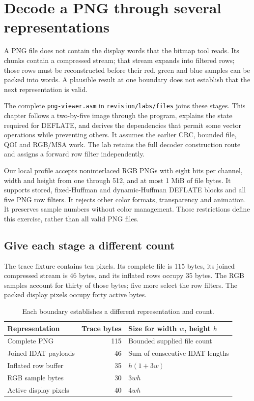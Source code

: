 \chapter{Decode a PNG through several representations}
\label{revision:png}

A PNG file does not contain the display words that the bitmap tool reads. Its
chunks contain a compressed stream; that stream expands into filtered rows;
those rows must be reconstructed before their red, green and blue samples can
be packed into words. A plausible result at one boundary does not establish
that the next representation is valid.

The complete \texttt{png-viewer.asm} in \texttt{revision/labs/files} joins these
stages. This chapter follows a two-by-five image through the program, explains
the state required for DEFLATE, and derives the dependencies that permit some
vector operations while preventing others. It assumes the earlier CRC, bounded
file, QOI and RGB/MSA work. The lab retains the full decoder construction route
and assigns a forward row filter independently.

Our local profile accepts noninterlaced RGB PNGs with eight bits per channel,
width and height from one through 512, and at most 1 MiB of file bytes. It
supports stored, fixed-Huffman and dynamic-Huffman DEFLATE blocks and all five
PNG row filters. It rejects other color formats, transparency and animation.
It preserves sample numbers without color management. Those restrictions define
this exercise, rather than all valid PNG files.

\section{Give each stage a different count}

The trace fixture contains ten pixels. Its complete file is 115 bytes, its
joined compressed stream is 46 bytes, and its inflated rows occupy 35 bytes.
The RGB samples account for thirty of those bytes; five more select the row
filters. The packed display pixels occupy forty active bytes.

\begin{table}[!ht]
  \centering
  \begin{tabular}{l r l}
    \toprule
    Representation        & Trace bytes & Size for width $w$, height $h$  \\
    \midrule
    Complete PNG          & 115         & Bounded supplied file count     \\
    Joined IDAT payloads  & 46          & Sum of consecutive IDAT lengths \\
    Inflated row buffer   & 35          & $h(1+3w)$                       \\
    RGB sample bytes      & 30          & $3wh$                           \\
    Active display pixels & 40          & $4wh$                           \\
    \bottomrule
  \end{tabular}
  \caption{Each boundary establishes a different representation and count.}
\end{table}

